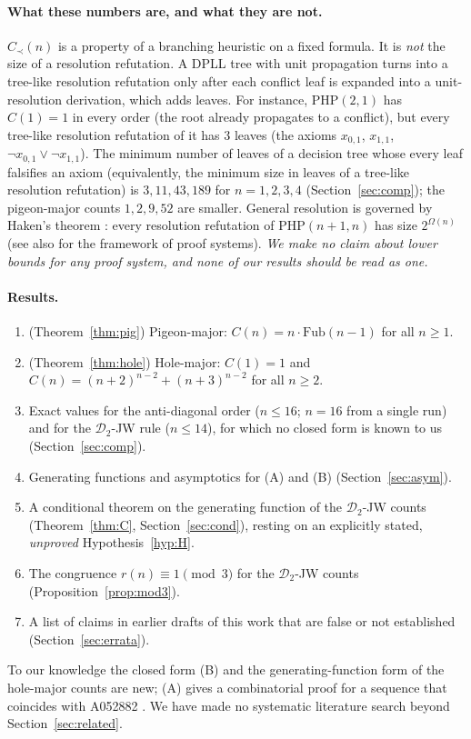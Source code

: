 \documentclass[11pt]{article}
\theoremstyle{definition}
\theoremstyle{remark}
\newcommand{\PHP}{\mathrm{PHP}}
\newcommand{\Fub}{\mathrm{Fub}}
\begin{document}
\paragraph{What these numbers are, and what they are not.}
$C_\prec(n)$ is a property of a branching heuristic on a fixed formula. It is \emph{not} the size of
a resolution refutation. A DPLL tree with unit propagation turns into a tree-like resolution
refutation only after each conflict leaf is expanded into a unit-resolution derivation, which adds
leaves. For instance, $\PHP(2,1)$ has $C(1)=1$ in every order (the root already propagates to a
conflict), but every tree-like resolution refutation of it has $3$ leaves (the axioms $x_{0,1}$,
$x_{1,1}$, $\neg x_{0,1}\vee\neg x_{1,1}$). The minimum number of leaves of a decision tree whose
every leaf falsifies an axiom (equivalently, the minimum size in leaves of a tree-like resolution
refutation) is $3,11,43,189$ for $n=1,2,3,4$ (Section~\ref{sec:comp}); the pigeon-major counts
$1,2,9,52$ are smaller. General resolution is governed by Haken's theorem \cite{Haken85}:
every resolution refutation of $\PHP(n{+}1,n)$ has size $2^{\Omega(n)}$ (see also
\cite{CR79} for the framework of proof systems). \emph{We make no claim about lower bounds for
any proof system, and none of our results should be read as one.}

\paragraph{Results.}
\begin{enumerate}
\item[(A)] (Theorem~\ref{thm:pig}) Pigeon-major: $C(n)=n\cdot\Fub(n-1)$ for all $n\ge1$.
\item[(B)] (Theorem~\ref{thm:hole}) Hole-major: $C(1)=1$ and $C(n)=(n+2)^{n-2}+(n+3)^{n-2}$ for
  all $n\ge2$.
\item[(C)] Exact values for the anti-diagonal order ($n\le16$; $n=16$ from a single run) and for the $\mathcal D_2$-JW rule
  ($n\le14$), for which no closed form is known to us (Section~\ref{sec:comp}).
\item[(D)] Generating functions and asymptotics for (A) and (B) (Section~\ref{sec:asym}).
\item[(E)] A conditional theorem on the generating function of the $\mathcal D_2$-JW counts
  (Theorem~\ref{thm:C}, Section~\ref{sec:cond}), resting on an explicitly stated, \emph{unproved}
  Hypothesis~\ref{hyp:H}.
\item[(G)] The congruence $r(n)\equiv1\pmod 3$ for the $\mathcal D_2$-JW counts (Proposition~\ref{prop:mod3}).
\item[(F)] A list of claims in earlier drafts of this work that are false or not established
  (Section~\ref{sec:errata}).
\end{enumerate}
To our knowledge the closed form (B) and the generating-function form of the hole-major counts
are new; (A) gives a combinatorial proof for a sequence that coincides with A052882 \cite{OEIS}.
We have made no systematic literature search beyond Section~\ref{sec:related}.
\end{document}
